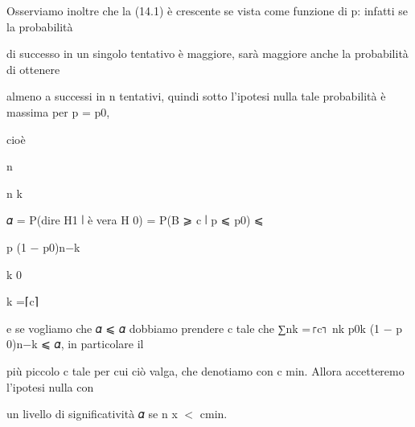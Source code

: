 \documentclass[a4paper,portrait,12pt]{article}
\begin{document}
\begin{flushleft}
Osserviamo inoltre che la (14.1) \`{e} crescente se vista come funzione di p: infatti se la probabilit\`{a}
\end{flushleft}


\begin{flushleft}
di successo in un singolo tentativo \`{e} maggiore, sar\`{a} maggiore anche la probabilit\`{a} di ottenere
\end{flushleft}


\begin{flushleft}
almeno a successi in n tentativi, quindi sotto l'ipotesi nulla tale probabilit\`{a} \`{e} massima per p = p0,
\end{flushleft}


\begin{flushleft}
cio\`{e}
\end{flushleft}


\begin{flushleft}
n
\end{flushleft}


\begin{flushleft}
n k
\end{flushleft}


\begin{flushleft}
𝛼 = P(dire H1 ∣ \`{e} vera H 0) = P(B ⩾ c ∣ p ⩽ p0) ⩽
\end{flushleft}


\begin{flushleft}
p (1 $-$ p0)n$-$k
\end{flushleft}


\begin{flushleft}
k 0
\end{flushleft}


\begin{flushleft}
k =⌈c⌉
\end{flushleft}





\begin{flushleft}
e se vogliamo che 𝛼 ⩽ 𝛼 dobbiamo prendere c tale che ∑nk =⌈c⌉ nk p0k (1 $-$ p 0)n$-$k ⩽ 𝛼, in particolare il
\end{flushleft}


\begin{flushleft}
più piccolo c tale per cui ci\`{o} valga, che denotiamo con c min. Allora accetteremo l'ipotesi nulla con
\end{flushleft}


\begin{flushleft}
un livello di significativit\`{a} 𝛼 se n x $<$ cmin.
\end{flushleft}
\end{document}
